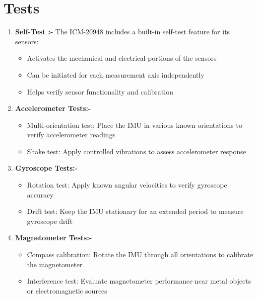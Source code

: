 \section{Tests}

\begin{enumerate}
	\item \textbf{Self-Test :-}
	The ICM-20948 includes a built-in self-test feature for its sensors:
	
	\begin{itemize}
		\item Activates the mechanical and electrical portions of the sensors
		\item Can be initiated for each measurement axis independently
		\item Helps verify sensor functionality and calibration
	\end{itemize}
	
	\item \textbf{Accelerometer Tests:-}
	\begin{itemize}
		\item Multi-orientation test: Place the IMU in various known orientations to verify accelerometer readings
		
		\item Shake test: Apply controlled vibrations to assess accelerometer response
	\end{itemize}
	\item \textbf{Gyroscope Tests:-}
	\begin{itemize}
		\item Rotation test: Apply known angular velocities to verify gyroscope accuracy
		
		\item Drift test: Keep the IMU stationary for an extended period to measure gyroscope drift
	\end{itemize}
	
	
	\item \textbf{Magnetometer Tests:-}
	\begin{itemize}
		\item Compass calibration: Rotate the IMU through all orientations to calibrate the magnetometer
		
		\item Interference test: Evaluate magnetometer performance near metal objects or electromagnetic sources
	\end{itemize}
	
\end{enumerate}

